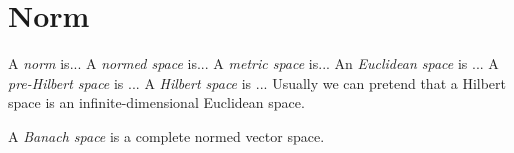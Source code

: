 \section{Norm}

%
A \emph{norm} is...
%
%
A \emph{normed space} is...
%
%
A \emph{metric space} is...
%
%
An \emph{Euclidean space} is ...
%
%
A \emph{pre-Hilbert space} is ...
%
%
A \emph{Hilbert space} is ...
Usually we can pretend that a Hilbert space is an infinite-dimensional Euclidean space.

%
%
A \emph{Banach space} is a complete normed vector space.
